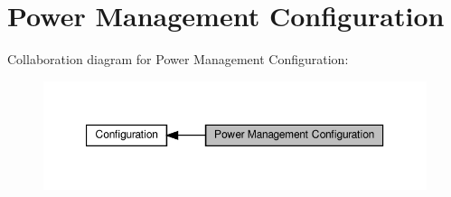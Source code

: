 \hypertarget{group__defines__power__management__configuration}{}\section{Power Management Configuration}
\label{group__defines__power__management__configuration}
Collaboration diagram for Power Management Configuration\+:
\nopagebreak
\begin{figure}[H]
\begin{center}
\leavevmode
\includegraphics[width=350pt]{group__defines__power__management__configuration}
\end{center}
\end{figure}
